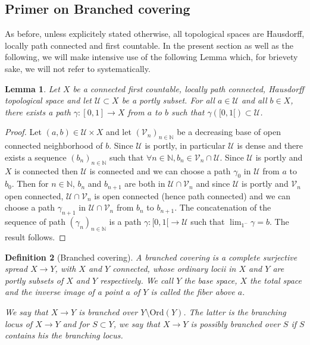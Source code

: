 \documentclass[a4paper,12pt]{article}
\newtheorem{lem}{Lemma}[section]          %
\newtheorem{defi}[lem]{Definition}    %
\def\U{\mathcal U}
\def\V{\mathcal V}
\def\N{\mathbb N}
\def\V{\mathcal V}
\def\N{\mathbb{N}}
\def\U{\mathcal{U}}
\def\ord{\mathrm{Ord}}
\begin{document}
\subsection{Primer on Branched covering} 
As before, unless explicitely stated otherwise, all topological spaces are Hausdorff, locally path connected and first countable. In the present section as well as the following, we will make intensive use of the following Lemma which, for brievety sake, we will not refer to systematically.
\begin{lem}\label{lem:path_covering} Let $X$ be a connected first countable, locally path connected, Hausdorff topological space and let $\U\subset X$ be a portly subset. 
For all $a\in \U$ and all $b\in X$, there exists a path $\gamma: [0,1]\rightarrow X$  from $a$ to $b$ such that $\gamma([0,1[)\subset \U$.
\end{lem}
\begin{proof}
 Let $(a,b) \in \U\times X$ and let $(\V_n)_{n\in \N}$ be a decreasing base of open connected neighborhood of $b$. Since $\U$ is portly, in particular $\U$ is dense and there exists a sequence $(b_n)_{n\in \N}$ such that  $\forall  n\in \N, b_n \in \V_n\cap \U$. Since $\U$ is portly and $X$ is connected then $\U$ is connected and we can choose a path $\gamma_0$ in $\U$ from $a$ to $b_0$. Then for $n\in \N$, $b_n$ and $b_{n+1}$ are both in $\U\cap \V_n$ and since $\U$ is portly and $\V_n$ open connected, $\U\cap \V_n$ is open connected (hence path connected) and we can choose a path $\gamma_{n+1}$ in $\U\cap \V_n$ from $b_n$ to $b_{n+1}$. The concatenation of the sequence of path $(\gamma_n)_{n\in \N}$ is a path $\gamma:[0,1[\rightarrow \U$ such that $\lim_{1^-}\gamma = b$. The result follows.
\end{proof} 




\begin{defi}[Branched covering]\label{def:branched_covering}  A {\it branched covering} is a complete surjective spread $X\rightarrow Y$, with $X$ and $Y$ connected, whose ordinary locii in $X$ and $Y$ are portly subsets of $X$ and $Y$ respectively. We call $Y$ the {\it base space}, $X$ the {\it total space} and the inverse image of a point $a$ of $Y$ is called the {\it fiber} above $a$.
 
 We say that $X\rightarrow Y$ is branched over $Y\setminus \ord(Y)$. The latter is the branching locus of $X\rightarrow Y$ and for $S\subset Y$, we say that $X\rightarrow Y$ is possibly branched over $S$ if $S$ contains his the branching locus.

 \end{defi}
 
\end{document}
